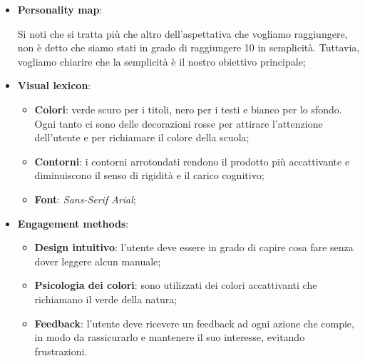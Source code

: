 \begin{itemize}
	\item \textbf{Personality map}:
	      \begin{center}
	      \end{center}

	      Si noti che si tratta più che altro dell'aspettativa che vogliamo
	      raggiungere, non è detto che siamo stati in grado di raggiungere 10 in
	      semplicità. Tuttavia, vogliamo chiarire che la semplicità è il nostro
	      obiettivo principale;

	\item \textbf{Visual lexicon}:
	      \begin{itemize}
		      \item \textbf{Colori}: verde scuro per i titoli, nero per i testi
		            e bianco per lo sfondo. Ogni tanto ci sono delle decorazioni
		            rosse per attirare l'attenzione dell'utente e per richiamare
		            il colore della scuola;

		      \item \textbf{Contorni}: i contorni arrotondati rendono il
		            prodotto più accattivante e diminuiscono il senso di rigidità
		            e il carico cognitivo;

		      \item \textbf{Font}: \textit{Sans-Serif Arial};
	      \end{itemize}

	\item \textbf{Engagement methods}:
	      \begin{itemize}
		      \item \textbf{Design intuitivo}: l'utente deve essere in
		            grado di capire cosa fare senza dover leggere alcun manuale;

		      \item \textbf{Psicologia dei colori}: sono utilizzati dei colori
		            accattivanti che richiamano il verde della natura;

		      \item \textbf{Feedback}: l'utente deve ricevere un feedback
		            ad ogni azione che compie, in modo da rassicurarlo e
		            mantenere il suo interesse, evitando frustrazioni.
	      \end{itemize}
\end{itemize}

